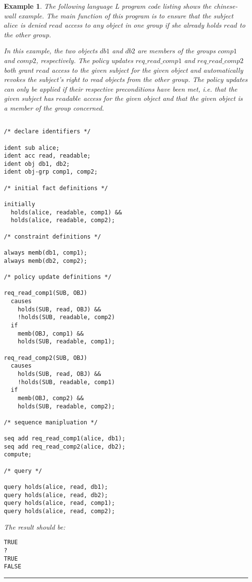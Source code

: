 \documentclass[10pt, twocolumn]{article}
\newtheorem{examp}{Example}
\newenvironment{example}{\begin{examp}\rm}{\rule{2mm}{2mm}\end{examp}}
\begin{document}
      \begin{example}
        The following language L program code listing shows the chinese-wall
        example.  The main function of this program is to ensure that the
        subject $alice$ is denied $read$ access to any object in one group if
        she already holds $read$ to the other group.

        In this example, the two objects $db1$ and $db2$ are members of the
        groups $comp1$ and $comp2$, respectively. The policy updates
        $req\_read\_comp1$ and $req\_read\_comp2$ both grant $read$ access
        to the given subject for the given object and automatically revokes
        the subject's right to read objects from the other group. The policy
        updates can only be applied if their respective preconditions have
        been met, i.e. that the given subject has $readable$ access for the
        given object and that the given object is a member of the group
        concerned.
        \begin{verbatim}

/* declare identifiers */

ident sub alice;
ident acc read, readable;
ident obj db1, db2;
ident obj-grp comp1, comp2;

/* initial fact definitions */

initially
  holds(alice, readable, comp1) &&
  holds(alice, readable, comp2);

/* constraint definitions */

always memb(db1, comp1);
always memb(db2, comp2);

/* policy update definitions */

req_read_comp1(SUB, OBJ)
  causes
    holds(SUB, read, OBJ) &&
    !holds(SUB, readable, comp2)
  if
    memb(OBJ, comp1) &&
    holds(SUB, readable, comp1);

req_read_comp2(SUB, OBJ)
  causes
    holds(SUB, read, OBJ) &&
    !holds(SUB, readable, comp1)
  if
    memb(OBJ, comp2) &&
    holds(SUB, readable, comp2);

/* sequence manipluation */

seq add req_read_comp1(alice, db1);
seq add req_read_comp2(alice, db2);
compute;

/* query */

query holds(alice, read, db1);
query holds(alice, read, db2);
query holds(alice, read, comp1);
query holds(alice, read, comp2);
        \end{verbatim}

        The result should be:

        \begin{verbatim}
TRUE
?
TRUE
FALSE
        \end{verbatim}
      \end{example}
\end{document}
